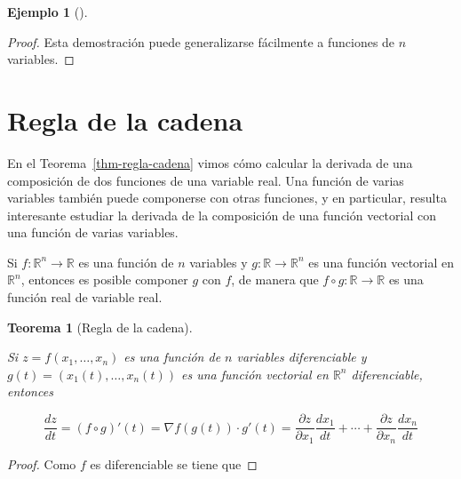 \documentclass[
  a4paper,
]{scrreport}
\theoremstyle{definition}
\newtheorem{example}{Ejemplo}[chapter]
\theoremstyle{plain}
\theoremstyle{definition}
\theoremstyle{definition}
\theoremstyle{plain}
\newtheorem{theorem}{Teorema}[chapter]
\theoremstyle{plain}
\theoremstyle{remark}
\begin{document}
\begin{example}[]
\begin{tcolorbox}
\begin{proof}
Esta demostración puede generalizarse fácilmente a funciones de \(n\)
variables.
\end{proof}

\end{tcolorbox}

\section{Regla de la cadena}\label{regla-de-la-cadena-2}

En el Teorema~\ref{thm-regla-cadena} vimos cómo calcular la derivada de
una composición de dos funciones de una variable real. Una función de
varias variables también puede componerse con otras funciones, y en
particular, resulta interesante estudiar la derivada de la composición
de una función vectorial con una función de varias variables.

Si \(f:\mathbb{R}^n\rightarrow \mathbb{R}\) es una función de \(n\)
variables y \(g:\mathbb{R}\rightarrow \mathbb{R}^n\) es una función
vectorial en \(\mathbb{R}^n\), entonces es posible componer \(g\) con
\(f\), de manera que \(f\circ g:\mathbb{R}\rightarrow \mathbb{R}\) es
una función real de variable real.

\begin{theorem}[Regla de la
cadena]\protect\hypertarget{thm-regla-cadena-funciones-varias-variables}{}\label{thm-regla-cadena-funciones-varias-variables}

Si \(z=f(x_1,\ldots,x_n)\) es una función de \(n\) variables
diferenciable y \(g(t)=(x_1(t),\ldots,x_n(t))\) es una función vectorial
en \(\mathbb{R}^n\) diferenciable, entonces

\[
\frac{dz}{dt} = (f\circ g)'(t) = \nabla f(g(t))\cdot g'(t) = \frac{\partial z}{\partial x_1}\frac{dx_1}{dt} + \cdots +\frac{\partial z}{\partial x_n}\frac{dx_n}{dt}
\]

\end{theorem}

\begin{tcolorbox}[enhanced jigsaw, leftrule=.75mm, colbacktitle=quarto-callout-note-color!10!white, toprule=.15mm, opacityback=0, opacitybacktitle=0.6, toptitle=1mm, breakable, bottomtitle=1mm, colframe=quarto-callout-note-color-frame, rightrule=.15mm, titlerule=0mm, title=\textcolor{quarto-callout-note-color}{\faInfo}\hspace{0.5em}{Demostración}, arc=.35mm, left=2mm, bottomrule=.15mm, colback=white, coltitle=black]

\begin{proof}
Como \(f\) es diferenciable se tiene que


\end{proof}
\end{tcolorbox}
\end{example}
\end{document}
